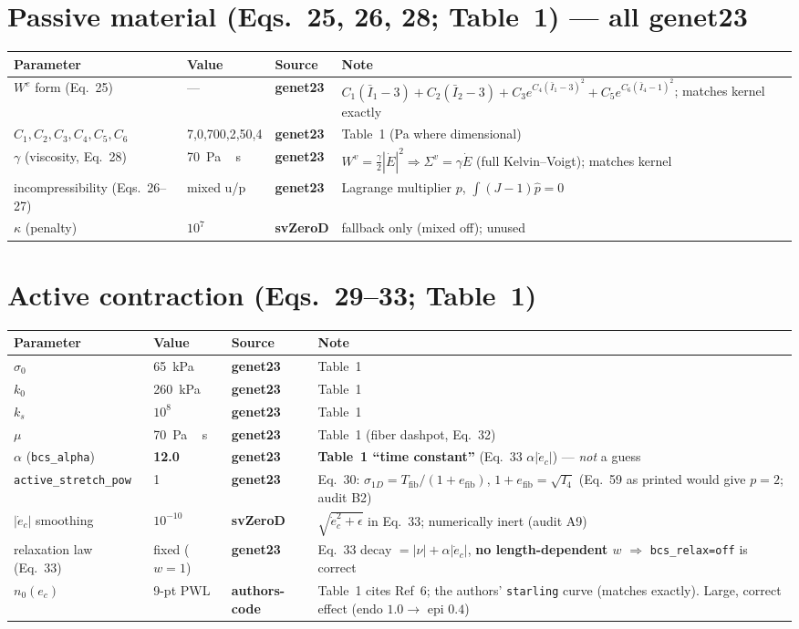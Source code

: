 \documentclass[10pt]{article}
\newcommand{\gen}{\textcolor{cgen}{\textbf{genet23}}}
\newcommand{\code}{\textcolor{ccode}{\textbf{authors-code}}}
\newcommand{\svz}{\textcolor{csvz}{\textbf{svZeroD}}}
\begin{document}
\section*{Passive material (Eqs.~25, 26, 28; Table~1) --- all \gen}
\begin{longtable}{l l l P{6.6cm}}
\toprule Parameter & Value & Source & Note \\ \midrule\endhead
$W^e$ form (Eq.~25) & --- & \gen & $C_1(\bar I_1{-}3){+}C_2(\bar I_2{-}3){+}C_3e^{C_4(\bar I_1-3)^2}{+}C_5e^{C_6(\bar I_4-1)^2}$; matches kernel exactly \\
$C_1{,}C_2{,}C_3{,}C_4{,}C_5{,}C_6$ & 7,0,700,2,50,4 & \gen & Table~1 (Pa where dimensional) \\
$\gamma$ (viscosity, Eq.~28) & \SI{70}{Pa\,s} & \gen & $W^v=\tfrac{\gamma}{2}|\dot E|^2\Rightarrow\Sigma^v=\gamma\dot E$ (full Kelvin--Voigt); matches kernel \\
incompressibility (Eqs.~26--27) & mixed u/p & \gen & Lagrange multiplier $p$, $\int(J{-}1)\hat p=0$ \\
$\kappa$ (penalty) & $10^7$ & \svz & fallback only (mixed off); unused \\
\bottomrule
\end{longtable}

\section*{Active contraction (Eqs.~29--33; Table~1)}
\begin{longtable}{l l l P{6.6cm}}
\toprule Parameter & Value & Source & Note \\ \midrule\endhead
$\sigma_0$ & \SI{65}{kPa} & \gen & Table~1 \\
$k_0$      & \SI{260}{kPa} & \gen & Table~1 \\
$k_s$      & $10^8$ & \gen & Table~1 \\
$\mu$      & \SI{70}{Pa\,s} & \gen & Table~1 (fiber dashpot, Eq.~32) \\
$\alpha$ (\texttt{bcs\_alpha}) & \textbf{12.0} & \gen & \textbf{Table~1 ``time constant''} (Eq.~33 $\alpha|\dot e_c|$) --- \emph{not} a guess \\
\texttt{active\_stretch\_pow} & 1 & \gen & Eq.~30: $\sigma_{1D}=T_\text{fib}/(1{+}e_\text{fib})$, $1{+}e_\text{fib}=\sqrt{I_4}$ (Eq.~59 as printed would give $p{=}2$; audit B2) \\
$|\dot e_c|$ smoothing & $10^{-10}$ & \svz & $\sqrt{\dot e_c^2+\epsilon}$ in Eq.~33; numerically inert (audit A9) \\
relaxation law (Eq.~33) & fixed ($w{=}1$) & \gen & Eq.~33 decay $=|\nu|+\alpha|\dot e_c|$, \textbf{no length-dependent $w$} $\Rightarrow$ \texttt{bcs\_relax=off} is correct \\
$n_0(e_c)$ & 9-pt PWL & \code & Table~1 cites Ref~6; the authors' \texttt{starling} curve (matches exactly). Large, correct effect (endo $1.0\to$ epi $0.4$) \\
\bottomrule
\end{longtable}
\end{document}
